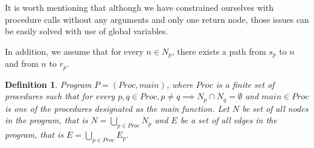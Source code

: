 \documentclass[..thesis.tex]{subfiles}
\newtheorem{defin}{Definition}[section]
\begin{document}
It is worth mentioning that although we have constrained ourselves with procedure calls without any arguments and only one return node,
 those issues can be easily solved with use of global variables. 

In addition, we assume that for every $n \in N_p$, there exists a path from $s_p$ to $n$ and from $n$ to $r_p$.  

\begin{defin}
Program $P = \left( Proc, main \right)$, where $Proc$ is a finite set of procedures such that for every $p,q \in Proc, p \neq q \implies N_p \cap N_q = \emptyset$ 
and $main \in Proc$ is one of the procedures designated as the main function.
 Let $N$ be set of all nodes in the program, that is $N = \bigcup_{p \in Proc}N_p$ and $E$ be a set of all edges in the program, that is $E = \bigcup_{p \in Proc}E_p$. 
\end{defin}
\end{document}
